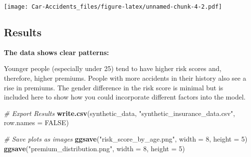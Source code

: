 \documentclass[
]{article}
\newenvironment{Shaded}{\begin{snugshade}}{\end{snugshade}}
\newcommand{\AttributeTok}[1]{\textcolor[rgb]{0.13,0.29,0.53}{#1}}
\newcommand{\CommentTok}[1]{\textcolor[rgb]{0.56,0.35,0.01}{\textit{#1}}}
\newcommand{\ConstantTok}[1]{\textcolor[rgb]{0.56,0.35,0.01}{#1}}
\newcommand{\DecValTok}[1]{\textcolor[rgb]{0.00,0.00,0.81}{#1}}
\newcommand{\FunctionTok}[1]{\textcolor[rgb]{0.13,0.29,0.53}{\textbf{#1}}}
\newcommand{\NormalTok}[1]{#1}
\newcommand{\StringTok}[1]{\textcolor[rgb]{0.31,0.60,0.02}{#1}}
\begin{document}
\texttt{[image: Car-Accidents\_files/figure-latex/unnamed-chunk-4-2.pdf]}

\subsection{Results}\label{results}

\textbf{The data shows clear patterns:}

Younger people (especially under 25) tend to have higher risk scores
and, therefore, higher premiums. People with more accidents in their
history also see a rise in premiums. The gender difference in the risk
score is minimal but is included here to show how you could incorporate
different factors into the model.

\begin{Shaded}
\begin{Highlighting}[]
\CommentTok{\# Export Results}
\FunctionTok{write.csv}\NormalTok{(synthetic\_data, }\StringTok{"synthetic\_insurance\_data.csv"}\NormalTok{, }\AttributeTok{row.names =} \ConstantTok{FALSE}\NormalTok{)}

\CommentTok{\# Save plots as images}
\FunctionTok{ggsave}\NormalTok{(}\StringTok{"risk\_score\_by\_age.png"}\NormalTok{, }\AttributeTok{width =} \DecValTok{8}\NormalTok{, }\AttributeTok{height =} \DecValTok{5}\NormalTok{)}
\FunctionTok{ggsave}\NormalTok{(}\StringTok{"premium\_distribution.png"}\NormalTok{, }\AttributeTok{width =} \DecValTok{8}\NormalTok{, }\AttributeTok{height =} \DecValTok{5}\NormalTok{)}
\end{Highlighting}
\end{Shaded}
\end{document}
